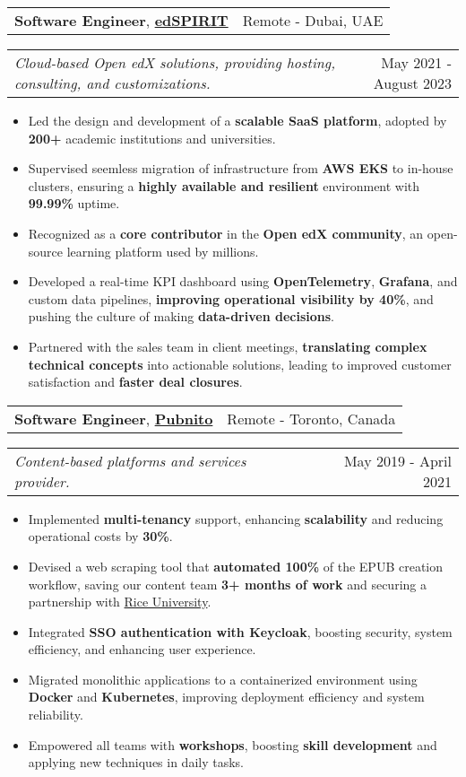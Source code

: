 \documentclass[letterpaper,11pt]{article}
\makeatletter
\newcommand{\resumeItemSimple}[1]{
  \item\small{
    {#1}
  }
}
\newcommand{\resumeSubheadingSimple}[5]{
    \begin{tabular*}{1\textwidth}[t]{l@{\extracolsep{\fill}}r}
      \textbf{#1}, \textbf{\href{#3}{#2}} \space \small#4 & \small#5 \\
    \end{tabular*}
}
\newcommand{\resumeSubSubheading}[2]{
    \begin{tabular*}{1\textwidth}{l@{\extracolsep{\fill}}r}
      \textit{\small#1} & \small #2 \\
    \end{tabular*}\vspace{-1pt}
}
\newcommand{\resumeItemListStart}{\begin{itemize}[leftmargin=0.5cm, itemsep=1pt, parsep=0pt]} %
\newcommand{\resumeItemListEnd}{\end{itemize}}
\makeatother
\begin{document}
      \resumeSubheadingSimple
        {Software Engineer}{edSPIRIT}{https://www.linkedin.com/company/edspirit-tech/}{}{Remote - Dubai, UAE}
        \resumeSubSubheading{Cloud-based Open edX solutions, providing hosting, consulting, and customizations.}{May 2021 - August 2023}
        \resumeItemListStart
          \resumeItemSimple{Led the design and development of a \textbf{scalable SaaS platform}, adopted by \textbf{200+} academic institutions and universities.}
          \resumeItemSimple{Supervised seemless migration of infrastructure from \textbf{AWS EKS} to in-house clusters, ensuring a \textbf{highly available and resilient} environment with \textbf{99.99\%} uptime.}
          \resumeItemSimple{Recognized as a \textbf{core contributor} in the \textbf{Open edX community}, an open-source learning platform used by millions.}
          \resumeItemSimple{Developed a real-time KPI dashboard using \textbf{OpenTelemetry}, \textbf{Grafana}, and custom data pipelines, \textbf{improving operational visibility by 40\%}, and pushing the culture of making \textbf{data-driven decisions}.}
          \resumeItemSimple{Partnered with the sales team in client meetings, \textbf{translating complex technical concepts} into actionable solutions, leading to improved customer satisfaction and \textbf{faster deal closures}.}
        \resumeItemListEnd

      \resumeSubheadingSimple
        {Software Engineer}{Pubnito}{https://www.linkedin.com/company/pubnito/}{}{Remote - Toronto, Canada}
        \resumeSubSubheading{Content-based platforms and services provider.}{May 2019 - April 2021}
        \resumeItemListStart
          \resumeItemSimple{Implemented \textbf{multi-tenancy} support, enhancing \textbf{scalability} and reducing operational costs by \textbf{30\%}.}
          \resumeItemSimple{Devised a web scraping tool that \textbf{automated 100\%} of the EPUB creation workflow, saving our content team \textbf{3+ months of work} and securing a partnership with \href{https://www.rice.edu/}{Rice University}.}
          \resumeItemSimple{Integrated \textbf{SSO authentication with Keycloak}, boosting security, system efficiency, and enhancing user experience.}
          \resumeItemSimple{Migrated monolithic applications to a containerized environment using \textbf{Docker} and \textbf{Kubernetes}, improving deployment efficiency and system reliability.}
          \resumeItemSimple{Empowered all teams with \textbf{workshops}, boosting \textbf{skill development} and applying new techniques in daily tasks.}
        \resumeItemListEnd
\end{document}
